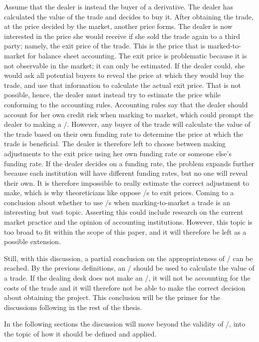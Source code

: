 \documentclass[main.tex]{subfiles}
\begin{document}
    Assume that the dealer is instead the buyer of a derivative.
    The dealer has calculated the value of the trade and decides to buy it.
    After obtaining the trade, at the price decided by the market, another price forms. 
    The dealer is now interested in the price she would receive 
    if she sold the trade again to a third party; namely, the exit price of the trade.
    This is the price that is marked-to-market for balance sheet accounting.
    The exit price is problematic because it is not observable in the market; 
    it can only be estimated.
    If the dealer could, she would ask all potential buyers to reveal the price 
    at which they would buy the trade, and use that information to calculate the actual exit price.
    That is not possible, hence, the dealer must instead try to estimate the price
    while conforming to the accounting rules.
    Accounting rules say that the dealer should account for her own credit risk 
    when marking to market, which could prompt the dealer to making a \DVA/.
    However, any buyer of the trade will calculate the value of the trade
    based on their own funding rate to determine the price at which the trade is beneficial.
    The dealer is therefore left to choose between making adjustments to the exit price
    using her own funding rate or someone else's funding rate.
    If the dealer decides on a funding rate, the problem expands further
    because each institution will have different funding rates, but no one will reveal their own.
    It is therefore impossible to really estimate the correct adjustment to make,
    which is why theoreticians like \textcite{HullWhite2012FVA} oppose \FVA/s to exit prices.
    Coming to a conclusion about whether to use \FVA/s when marking-to-market a trade
    is an interesting but vast topic.
    Asserting this could include research on the current market practice and
    the opinion of accounting institutions.
    However, this topic is too broad to fit within the scope of this paper,
    and it will therefore be left as a possible extension.

    Still, with this discussion, 
    a partial conclusion on the appropriateness of \FVA/ can be reached.
    By the previous definitions, an \FVA/ should be used to calculate the value of a trade.
    If the dealing desk does not make an \FVA/, it will not be accounting for the costs of the trade
    and it will therefore not be able to make the correct decision about obtaining the project.
    This conclusion will be the primer for the discussions following in the rest of the thesis.
    
    In the following sections the discussion will move beyond the validity of \FVA/,
    into the topic of how it should be defined and applied.
    
\end{document}
